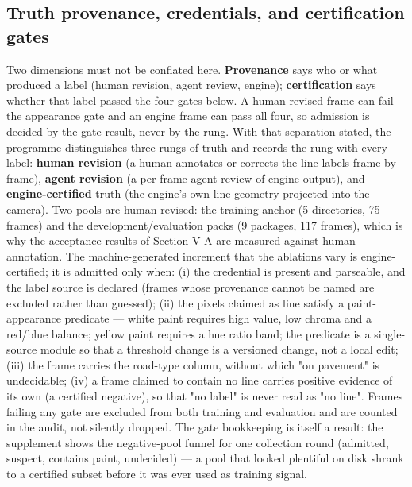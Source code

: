 \documentclass[journal]{IEEEtran}
\begin{document}
\subsection{Truth provenance, credentials, and certification gates}
Two dimensions must not be conflated here. \textbf{Provenance} says who or what produced a label (human
revision, agent review, engine); \textbf{certification} says whether that label passed the four gates below.
A human-revised frame can fail the appearance gate and an engine frame can pass all four, so admission is
decided by the gate result, never by the rung. With that separation stated, the programme distinguishes
three rungs of truth and records the rung with every label: \textbf{human revision} (a human
annotates or corrects the line labels frame by frame), \textbf{agent revision} (a per-frame agent review of engine output), and
\textbf{engine-certified} truth (the engine's own line geometry projected into the camera). Two pools are human-revised: the
training anchor (5 directories, 75 frames) and the development/evaluation packs (9 packages, 117 frames), which is why the
acceptance results of Section V-A are measured against human annotation. The machine-generated increment that the ablations
vary is engine-certified; it is admitted only when: (i) the credential is present and parseable, and the label source is
declared (frames whose provenance cannot be named are excluded rather than guessed); (ii) the pixels
claimed as line satisfy a paint-appearance predicate --- white paint requires high value, low chroma
and a red/blue balance; yellow paint requires a hue ratio band; the predicate is a single-source
module so that a threshold change is a versioned change, not a local edit; (iii) the frame carries the
road-type column, without which "on pavement" is undecidable; (iv) a frame claimed to contain no line
carries positive evidence of its own (a certified negative), so that "no label" is never read as
"no line". Frames failing any gate are excluded from both training and evaluation and are counted in
the audit, not silently dropped.
The gate bookkeeping is itself a result: the supplement shows the negative-pool funnel for one collection round (admitted, suspect, contains paint, undecided) --- a pool that looked plentiful on disk shrank to a certified subset before it was ever used as training signal.
\end{document}
